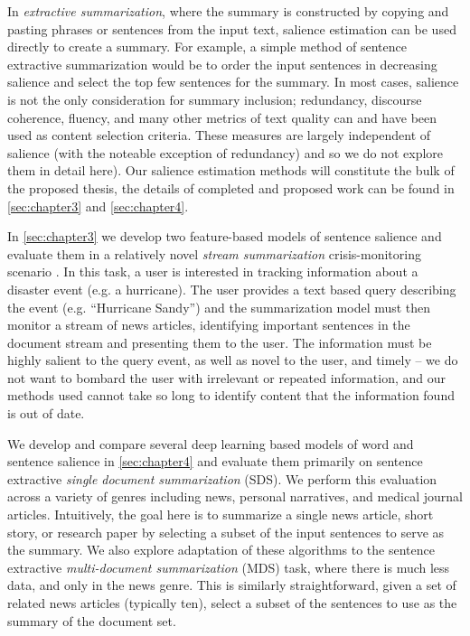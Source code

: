 In \emph{extractive summarization}, 
where the summary is constructed by copying and pasting phrases or sentences 
from the input text, salience estimation can be used directly to create
a summary. For example, a simple method of sentence extractive summarization
would be to order the input sentences in decreasing salience and select the
top few sentences for the summary. In most cases, salience is not the only
consideration for summary inclusion; redundancy, discourse coherence, fluency,
and many other metrics of text quality can and have been used as content
selection criteria. These measures are largely independent of salience 
(with the noteable exception of redundancy) and so we do not explore them in 
detail here). Our salience estimation methods will constitute the bulk of the
proposed thesis, the details of completed and proposed work can be found
in \autoref{sec:chapter3} and \autoref{sec:chapter4}.

In \autoref{sec:chapter3} we develop two feature-based models of sentence
salience and evaluate them in a relatively novel \emph{stream summarization} 
crisis-monitoring scenario
\citep{starbird2013working,aslam2016trec}. In this task, a user is interested
in tracking information about a disaster event (e.g. a hurricane). The
user provides a text based query describing the event 
(e.g. ``Hurricane Sandy'') and the summarization model must then 
monitor a stream of news articles, identifying important sentences in the 
document stream and presenting them to the user. The information must be 
highly salient to the query event, as well as novel to the user, and timely
-- we do not want to bombard the user with irrelevant or repeated information,
and our methods used cannot take so long to identify content that the 
information found is out of date.
  
We develop and compare several deep learning based models of word and 
sentence salience in \autoref{sec:chapter4} and evaluate them primarily on
sentence extractive \emph{single document summarization} (SDS). 
We perform this evaluation across
a variety of genres including news, personal narratives, and medical journal
articles. Intuitively, the goal here is to summarize a single news article, 
short story, or research paper by selecting a subset of the input sentences
to serve as the summary. We also explore adaptation of these algorithms to 
the sentence extractive \emph{multi-document summarization} (MDS) task, 
where there is much less data, and only in the news genre.
This is similarly straightforward, given a set of related news articles 
(typically ten), select a subset of the sentences to use as the summary of
the document set.


